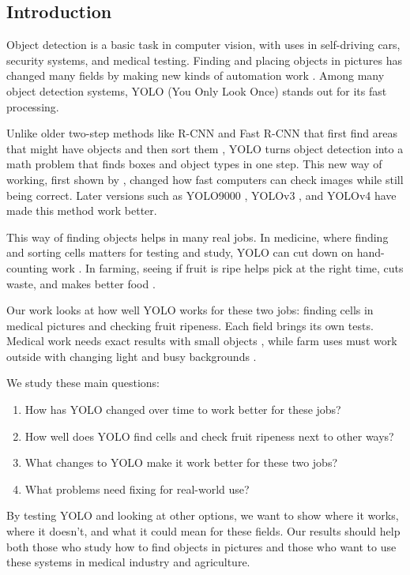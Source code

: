 \begin{multicols}{2}
	\section{Introduction}
	Object detection is a basic task in computer vision, with uses in self-driving cars, security systems, and medical testing. Finding and placing objects in pictures has changed many fields by making new kinds of automation work \citep{8627998}. Among many object detection systems, YOLO (You Only Look Once) stands out for its fast processing.

	Unlike older two-step methods like R-CNN and Fast R-CNN that first find areas that might have objects and then sort them \citep{7410526}, YOLO turns object detection into a math problem that finds boxes and object types in one step. This new way of working, first shown by \citet{redmon2016lookonceunifiedrealtime}, changed how fast computers can check images while still being correct. Later versions such as YOLO9000 \citep{8100173}, YOLOv3 \citep{redmon2018yolov3}, and YOLOv4 \citep{bochkovskiy2020yolov4} have made this method work better.

	This way of finding objects helps in many real jobs. In medicine, where finding and sorting cells matters for testing and study, YOLO can cut down on hand-counting work \citep{Chan2020}. In farming, seeing if fruit is ripe helps pick at the right time, cuts waste, and makes better food \citep{Koirala2019}.

	Our work looks at how well YOLO works for these two jobs: finding cells in medical pictures and checking fruit ripeness. Each field brings its own tests. Medical work needs exact results with small objects \citep{electronics8030292}, while farm uses must work outside with changing light and busy backgrounds \citep{KAMILARIS201870}.

	We study these main questions:
	\begin{enumerate}
		\item How has YOLO changed over time to work better for these jobs?
		\item How well does YOLO find cells and check fruit ripeness next to other ways?
		\item What changes to YOLO make it work better for these two jobs?
		\item What problems need fixing for real-world use?
	\end{enumerate}

	By testing YOLO and looking at other options, we want to show where it works, where it doesn't, and what it could mean for these fields. Our results should help both those who study how to find objects in pictures and those who want to use these systems in medical industry and agriculture.
\end{multicols}